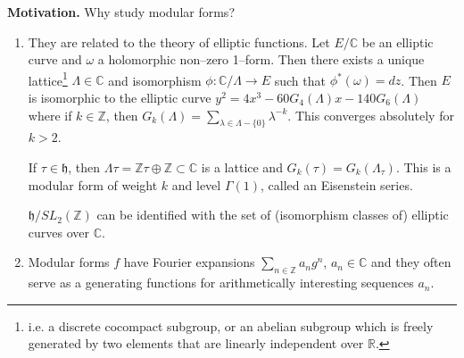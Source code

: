 \documentclass{article}
\theoremstyle{definition}
\begin{document}
\textbf{Motivation.} Why study modular forms?
\begin{enumerate}[(1)]
    \item They are related to the theory of elliptic functions.
    Let $E/\mathbb{C}$ be an elliptic curve and $\omega$ a holomorphic non--zero 1--form. Then there exists a unique lattice\footnote{i.e. a discrete cocompact subgroup, or an abelian subgroup which is freely generated by two elements that are linearly independent over $\mathbb{R}$.} $\Lambda \in \mathbb{C}$ and isomorphism $\phi : \mathbb{C}/\Lambda \to E$ such that $\phi^*(\omega) = dz$. Then $E$ is isomorphic to the elliptic curve $y^2 = 4x^3 - 60G_4(\Lambda)x - 140G_6(\Lambda)$ where if $k \in \mathbb{Z}$, then $G_k(\Lambda) = \sum_{\lambda \in \Lambda - \{0\}}^{} \lambda^{-k}$. This converges absolutely for $k>2$.

    If $\tau \in \mathfrak{h}$, then $\Lambda \tau = \mathbb{Z} \tau \oplus \mathbb{Z} \subset \mathbb{C}$ is a lattice and $G_k(\tau) = G_k(\Lambda_\tau)$. This is a modular form of weight $k$ and level $\Gamma(1)$, called an Eisenstein series.
    \vspace{1mm}
     
    $\mathfrak{h}/SL_2(\mathbb{Z})$ can be identified with the set of (isomorphism classes of) elliptic curves over $\mathbb{C}$.
    \item Modular forms $f$ have Fourier expansions $\sum_{n \in \mathbb{Z}}^{} a_n g^n$, $a_n \in \mathbb{C}$ and they often serve as a generating functions for arithmetically interesting sequences $a_n$.
    \vspace{1mm}
     

\end{enumerate}
\end{document}
